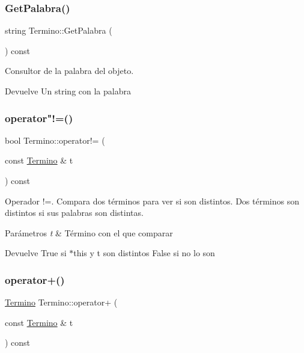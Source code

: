 \subsubsection{\texorpdfstring{GetPalabra()}{GetPalabra()}}
{\footnotesize\ttfamily string Termino\+::\+Get\+Palabra (\begin{DoxyParamCaption}{ }\end{DoxyParamCaption}) const}



Consultor de la palabra del objeto. 

\begin{DoxyReturn}{Devuelve}
Un string con la palabra 
\end{DoxyReturn}
\mbox{\label{classTermino_a18fcc1cd64321afc8e17bb7ddaa9172a}} 
\subsubsection{\texorpdfstring{operator"!=()}{operator!=()}}
{\footnotesize\ttfamily bool Termino\+::operator!= (\begin{DoxyParamCaption}\item[{const \mbox{\hyperlink{classTermino}{Termino}} \&}]{t }\end{DoxyParamCaption}) const}



Operador !=. Compara dos términos para ver si son distintos. Dos términos son distintos si sus palabras son distintas. 


\begin{DoxyParams}{Parámetros}
{\em t} & Término con el que comparar \\
\hline
\end{DoxyParams}
\begin{DoxyReturn}{Devuelve}
True si $\ast$this y t son distintos False si no lo son 
\end{DoxyReturn}
\mbox{\label{classTermino_a08f2b837973daf93551e1499639194fb}} 
\subsubsection{\texorpdfstring{operator+()}{operator+()}}
{\footnotesize\ttfamily \mbox{\hyperlink{classTermino}{Termino}} Termino\+::operator+ (\begin{DoxyParamCaption}\item[{const \mbox{\hyperlink{classTermino}{Termino}} \&}]{t }\end{DoxyParamCaption}) const}



